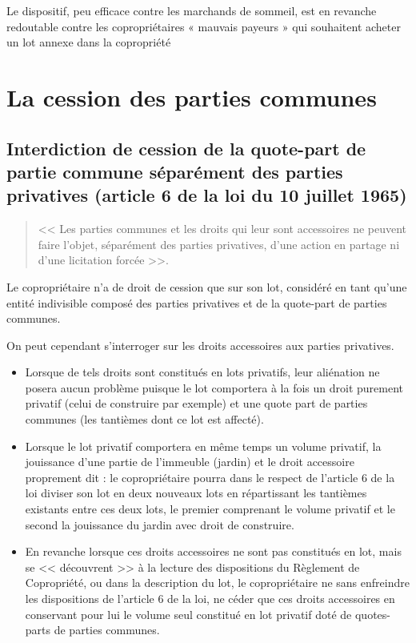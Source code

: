 			Le dispositif, peu efficace contre les marchands de sommeil, est en revanche redoutable contre les
			copropriétaires « mauvais payeurs » qui souhaitent acheter un lot annexe dans la copropriété

\section{La cession des parties communes}

	\subsection{Interdiction de cession de la quote-part de partie commune séparément des parties privatives (article 6 de la loi du 10 juillet 1965)}
	
		\begin{quote}
			<< Les parties communes et les droits qui leur sont accessoires ne peuvent faire l'objet, séparément des
			parties privatives, d'une action en partage ni d'une licitation forcée >>.
		\end{quote}
		
		Le copropriétaire n'a de droit de cession que sur son lot, considéré en tant qu'une entité indivisible
		composé des parties privatives et de la quote-part de parties communes.
		
		On peut cependant s'interroger sur les droits accessoires aux parties privatives.
		\begin{itemize}
			\item Lorsque de tels droits sont constitués en lots privatifs, leur aliénation ne posera aucun
			problème puisque le lot comportera à la fois un droit purement privatif (celui de construire
			par exemple) et une quote part de parties communes (les tantièmes dont ce lot est affecté).
			
			\item Lorsque le lot privatif comportera en même temps un volume privatif, la jouissance d'une
			partie de l'immeuble (jardin) et le droit accessoire proprement dit : le copropriétaire pourra
			dans le respect de l'article 6 de la loi diviser son lot en deux nouveaux lots en répartissant
			les tantièmes existants entre ces deux lots, le premier comprenant le volume privatif et le
			second la jouissance du jardin avec droit de construire.
			
			\item En revanche lorsque ces droits accessoires ne sont pas constitués en lot, mais se
			<< découvrent >> à la lecture des dispositions du Règlement de Copropriété, ou dans la
			description du lot, le copropriétaire ne sans enfreindre les dispositions de l'article 6 de la
			loi, ne céder que ces droits accessoires en conservant pour lui le volume seul constitué en
			lot privatif doté de quotes-parts de parties communes.
		\end{itemize}
		
